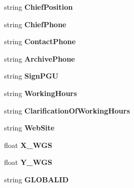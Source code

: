 \begin{DoxyCompactItemize}
\item 
string {\bfseries Chief\+Position}\hspace{0.3cm}{\ttfamily  [get, set]}\label{classkdz__manager_1_1_registry_office_data_row_ab744770e144d24909e9ed3f50748843e}

\item 
string {\bfseries Chief\+Phone}\hspace{0.3cm}{\ttfamily  [get, set]}\label{classkdz__manager_1_1_registry_office_data_row_a64ef3ef40186d005d587d77c70918067}

\item 
string {\bfseries Contact\+Phone}\hspace{0.3cm}{\ttfamily  [get, set]}\label{classkdz__manager_1_1_registry_office_data_row_a60e6463566cb751d141d67d7984f3172}

\item 
string {\bfseries Archive\+Phone}\hspace{0.3cm}{\ttfamily  [get, set]}\label{classkdz__manager_1_1_registry_office_data_row_ac0123ac2ba612e4e6639c3be12fa0b38}

\item 
string {\bfseries Sign\+P\+G\+U}\hspace{0.3cm}{\ttfamily  [get, set]}\label{classkdz__manager_1_1_registry_office_data_row_a830f3a9d060596330cb0a05e16585d08}

\item 
string {\bfseries Working\+Hours}\hspace{0.3cm}{\ttfamily  [get, set]}\label{classkdz__manager_1_1_registry_office_data_row_ae23dd44a8a4e9b18cff4494ecf4d03cc}

\item 
string {\bfseries Clarification\+Of\+Working\+Hours}\hspace{0.3cm}{\ttfamily  [get, set]}\label{classkdz__manager_1_1_registry_office_data_row_a201b25d204d2985fae8cabbfa1dd2c6e}

\item 
string {\bfseries Web\+Site}\hspace{0.3cm}{\ttfamily  [get, set]}\label{classkdz__manager_1_1_registry_office_data_row_adb0ed212a01483827640afd66235aa28}

\item 
float {\bfseries X\+\_\+\+W\+G\+S}\hspace{0.3cm}{\ttfamily  [get, set]}\label{classkdz__manager_1_1_registry_office_data_row_affa3a219101796e0b7970061b4688790}

\item 
float {\bfseries Y\+\_\+\+W\+G\+S}\hspace{0.3cm}{\ttfamily  [get, set]}\label{classkdz__manager_1_1_registry_office_data_row_afe838c8f7955c7af682c53bc1147d698}

\item 
string {\bfseries G\+L\+O\+B\+A\+L\+I\+D}\hspace{0.3cm}{\ttfamily  [get, set]}\label{classkdz__manager_1_1_registry_office_data_row_a3455001407f0d47c030d9f6023314c04}

\end{DoxyCompactItemize}


